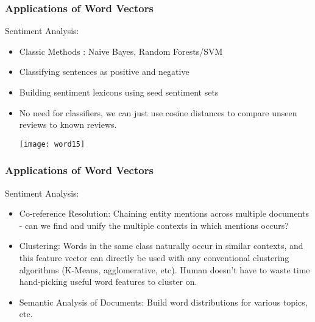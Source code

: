 \begin{frame}[fragile]\frametitle{Applications of Word Vectors}
Sentiment Analysis:
\begin{itemize}
\item Classic Methods : Naive Bayes, Random Forests/SVM
\item Classifying sentences as positive and negative
\item Building sentiment lexicons using seed sentiment sets
\item No need for classifiers, we can just use cosine distances to compare unseen reviews to known reviews.

\begin{center}
\texttt{[image: word15]}
\end{center}
\end{itemize}
\end{frame}

\begin{frame}[fragile]\frametitle{Applications of Word Vectors}
Sentiment Analysis:
\begin{itemize}
\item Co-reference Resolution: Chaining entity mentions across multiple documents  - can we find and unify the multiple contexts in which mentions occurs?
\item Clustering: Words in the same class naturally occur in similar contexts,  and this feature vector can directly be used with any conventional clustering algorithms (K-Means, agglomerative, etc). Human doesn't have to waste time hand-picking useful word features to cluster on.
\item Semantic Analysis of Documents: Build word distributions for various topics, etc.

\end{itemize}
\end{frame}
